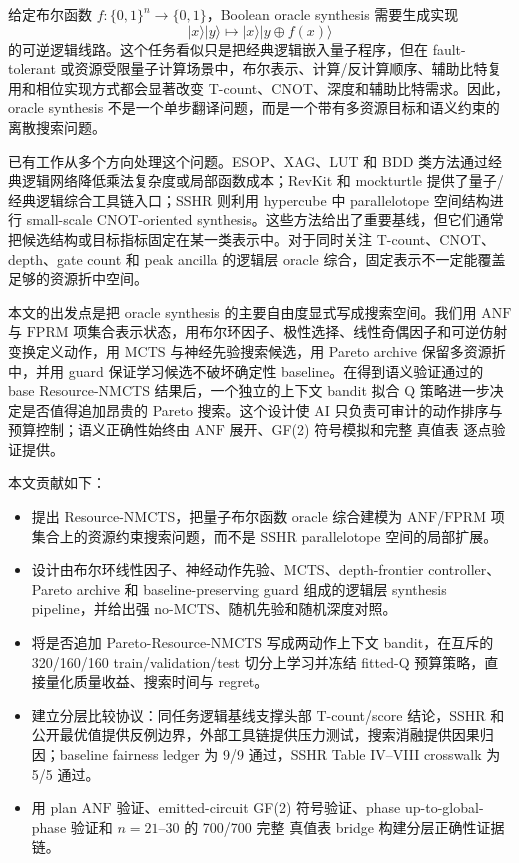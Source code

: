 \documentclass[UTF8,fontset=fandol,11pt]{ctexart}
\newcommand{\method}{Resource-NMCTS}
\newcommand{\anf}{\ensuremath{\mathrm{ANF}}}
\newcommand{\fprm}{\ensuremath{\mathrm{FPRM}}}
\newcommand{\mcts}{\ensuremath{\mathrm{MCTS}}}
\newcommand{\xor}{\ensuremath{\oplus}}
\newcommand{\ttable}{真值表}
\begin{document}
给定布尔函数 $f:\{0,1\}^n\rightarrow\{0,1\}$，Boolean oracle synthesis 需要生成实现
\begin{equation}
  |x\rangle |y\rangle \mapsto |x\rangle |y\xor f(x)\rangle
  \label{eq:oracle}
\end{equation}
的可逆逻辑线路。这个任务看似只是把经典逻辑嵌入量子程序，但在 fault-tolerant 或资源受限量子计算场景中，布尔表示、计算/反计算顺序、辅助比特复用和相位实现方式都会显著改变 T-count、CNOT、深度和辅助比特需求。因此，oracle synthesis 不是一个单步翻译问题，而是一个带有多资源目标和语义约束的离散搜索问题。

已有工作从多个方向处理这个问题。ESOP、XAG、LUT 和 BDD 类方法通过经典逻辑网络降低乘法复杂度或局部函数成本\cite{wille2009bdd,meuli2020ros,meuli2022xag}；RevKit 和 mockturtle 提供了量子/经典逻辑综合工具链入口\cite{soeken2018epfl,revkit,mockturtle}；SSHR 则利用 hypercube 中 parallelotope 空间结构进行 small-scale CNOT-oriented synthesis\cite{zheng2025sshr}。这些方法给出了重要基线，但它们通常把候选结构或目标指标固定在某一类表示中。对于同时关注 T-count、CNOT、depth、gate count 和 peak ancilla 的逻辑层 oracle 综合，固定表示不一定能覆盖足够的资源折中空间。

本文的出发点是把 oracle synthesis 的主要自由度显式写成搜索空间。我们用 \anf{} 与 \fprm{} 项集合表示状态，用布尔环因子、极性选择、线性奇偶因子和可逆仿射变换定义动作，用 \mcts{} 与神经先验搜索候选，用 Pareto archive 保留多资源折中，并用 guard 保证学习候选不破坏确定性 baseline。在得到语义验证通过的 base \method{} 结果后，一个独立的上下文 bandit 拟合 Q 策略进一步决定是否值得追加昂贵的 Pareto 搜索。这个设计使 AI 只负责可审计的动作排序与预算控制；语义正确性始终由 \anf{} 展开、GF(2) 符号模拟和完整 \ttable{} 逐点验证提供。

本文贡献如下：
\begin{itemize}
  \item 提出 \method{}，把量子布尔函数 oracle 综合建模为 \anf{}/\fprm{} 项集合上的资源约束搜索问题，而不是 SSHR parallelotope 空间的局部扩展。
  \item 设计由布尔环线性因子、神经动作先验、\mcts{}、depth-frontier controller、Pareto archive 和 baseline-preserving guard 组成的逻辑层 synthesis pipeline，并给出强 no-\mcts{}、随机先验和随机深度对照。
  \item 将是否追加 Pareto-\method{} 写成两动作上下文 bandit，在互斥的 320/160/160 train/validation/test 切分上学习并冻结 fitted-Q 预算策略，直接量化质量收益、搜索时间与 regret。
  \item 建立分层比较协议：同任务逻辑基线支撑头部 T-count/score 结论，SSHR 和公开最优值提供反例边界，外部工具链提供压力测试，搜索消融提供因果归因；baseline fairness ledger 为 9/9 通过，SSHR Table IV--VIII crosswalk 为 5/5 通过。
  \item 用 plan \anf{} 验证、emitted-circuit GF(2) 符号验证、phase up-to-global-phase 验证和 $n=21$--$30$ 的 700/700 完整 \ttable{} bridge 构建分层正确性证据链。
\end{itemize}
\end{document}
